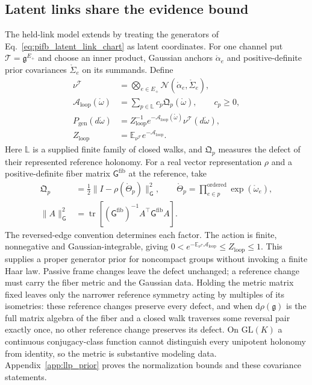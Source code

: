 \subsection{Latent links share the evidence bound}\label{sec:latent_link_bound}
The held-link model extends by treating the generators of Eq.~\eqref{eq:pifb_latent_link_chart} as latent coordinates. For one channel put $\mathcal T=\mathfrak g^{E_+}$ and choose an inner product, Gaussian anchors $\mathring\alpha_e$ and positive-definite prior covariances $\mathring\Sigma_e$ on its summands. Define
\begin{equation}
\begin{aligned}
\nu^{\mathcal T}&=\bigotimes_{e\in E_+}\mathcal N(\mathring\alpha_e,\mathring\Sigma_e),\\
\mathcal A_{\mathrm{loop}}(\mathring\omega)&=\sum_{p\in\mathbb L}c_p\mathfrak Q_p(\mathring\omega),\qquad c_p\geq0,\\
P_{\mathrm{gen}}(d\mathring\omega)&=Z_{\mathrm{loop}}^{-1}e^{-\mathcal A_{\mathrm{loop}}(\mathring\omega)}\nu^{\mathcal T}(d\mathring\omega),\\
Z_{\mathrm{loop}}&=\mathbb E_{\nu^{\mathcal T}}e^{-\mathcal A_{\mathrm{loop}}}.
\end{aligned}
\label{eq:pifb_generator_prior}
\end{equation}
Here $\mathbb L$ is a supplied finite family of closed walks, and $\mathfrak Q_p$ measures the defect of their represented reference holonomy. For a real vector representation $\rho$ and a positive-definite fiber matrix $\mathsf G^{\mathrm{fib}}$ at the reference, take
\begin{equation}
\begin{aligned}
\mathfrak Q_p&=\tfrac12\|I-\rho(\mathring\Theta_p)\|_{\mathsf G}^2,\qquad
\mathring\Theta_p=\prod_{e\in p}^{\mathrm{ordered}}\exp(\mathring\omega_e),\\
\|A\|_{\mathsf G}^2&=\operatorname{tr}[(\mathsf G^{\mathrm{fib}})^{-1}A^\top\mathsf G^{\mathrm{fib}}A].
\end{aligned}
\label{eq:pifb_metric_loop_defect}
\end{equation}
The reversed-edge convention determines each factor. The action is finite, nonnegative and Gaussian-integrable, giving $0<e^{-\mathbb E_{\nu^{\mathcal T}}\mathcal A_{\mathrm{loop}}}\leq Z_{\mathrm{loop}}\leq1$. This supplies a proper generator prior for noncompact groups without invoking a finite Haar law. Passive frame changes leave the defect unchanged; a reference change must carry the fiber metric and the Gaussian data. Holding the metric matrix fixed leaves only the narrower reference symmetry acting by multiples of its isometries: these reference changes preserve every defect, and when $\mathrm d\rho(\mathfrak g)$ is the full matrix algebra of the fiber and a closed walk traverses some reversal pair exactly once, no other reference change preserves its defect. On $\mathrm{GL}(K)$ a continuous conjugacy-class function cannot distinguish every unipotent holonomy from identity, so the metric is substantive modeling data. Appendix~\ref{app:llp_prior} proves the normalization bounds and these covariance statements.

